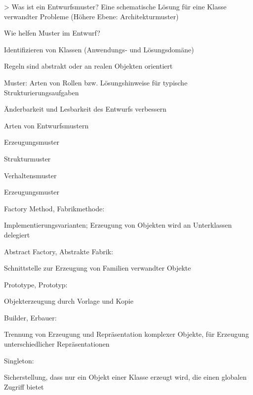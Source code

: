 \documentclass[a4paper]{article}
\begin{document}
\begin{multicols}{3}
  > Was ist ein Entwurfsmuster? Eine schematische Lösung für eine Klasse verwandter Probleme (Höhere Ebene: Architekturmuster)
  \begin{itemize*}
    \item Wie helfen Muster im Entwurf?
    \begin{itemize*}
      \item Identifizieren von Klassen (Anwendungs- und Lösungsdomäne)
      \item Regeln sind abstrakt oder an realen Objekten orientiert
      \item Muster: Arten von Rollen bzw. Lösungshinweise für typische Strukturierungsaufgaben
      \item Änderbarkeit und Lesbarkeit des Entwurfs verbessern
    \end{itemize*}
    \item Arten von Entwurfsmustern
    \begin{itemize*}
      \item Erzeugungsmuster
      \item Strukturmuster
      \item Verhaltensmuster
    \end{itemize*}
    \item Erzeugungsmuster
    \begin{itemize*}
      \item Factory Method, Fabrikmethode:
      \item Implementierungsvarianten; Erzeugung von Objekten wird an Unterklassen delegiert
      \item Abstract Factory, Abstrakte Fabrik:
      \item Schnittstelle zur Erzeugung von Familien verwandter Objekte
      \item Prototype, Prototyp:
      \item Objekterzeugung durch Vorlage und Kopie
      \item Builder, Erbauer:
      \item Trennung von Erzeugung und Repräsentation komplexer Objekte, für Erzeugung unterschiedlicher Repräsentationen
      \item Singleton:
      \item Sicherstellung, dass nur ein Objekt einer Klasse erzeugt wird, die einen globalen Zugriff bietet
    \end{itemize*}
  \end{itemize*}


\end{multicols}
\end{document}
